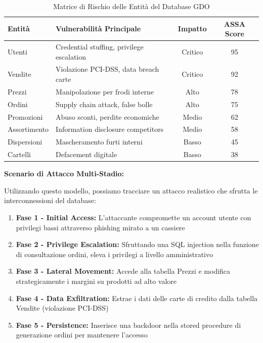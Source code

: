 \begin{table}[htbp]
\centering
\caption{Matrice di Rischio delle Entità del Database GDO}
\label{tab:risk_matrix_database}
\begin{tabularx}{\textwidth}{@{}lXcc@{}}
\toprule
\textbf{Entità} & \textbf{Vulnerabilità Principale} & \textbf{Impatto} & \textbf{ASSA Score}\\
\midrule
\rowcolor{red!20}
Utenti & Credential stuffing, privilege escalation & Critico & 95 \\
\rowcolor{red!20}
Vendite & Violazione PCI-DSS, data breach carte & Critico & 92 \\
\rowcolor{orange!20}
Prezzi & Manipolazione per frodi interne & Alto & 78 \\
\rowcolor{orange!20}
Ordini & Supply chain attack, false bolle & Alto & 75 \\
\rowcolor{yellow!20}
Promozioni & Abuso sconti, perdite economiche & Medio & 62 \\
\rowcolor{yellow!20}
Assortimento & Information disclosure competitors & Medio & 58 \\
\rowcolor{green!20}
Dispersioni & Mascheramento furti interni & Basso & 45 \\
\rowcolor{green!20}
Cartelli & Defacement digitale & Basso & 38 \\
\bottomrule
\end{tabularx}
\end{table}

\textbf{Scenario di Attacco Multi-Stadio:}

Utilizzando questo modello, possiamo tracciare un attacco realistico che sfrutta le interconnessioni del database:

\begin{enumerate}
\item \textbf{Fase 1 - Initial Access:} L'attaccante compromette un account utente con privilegi bassi attraverso phishing mirato a un cassiere

\item \textbf{Fase 2 - Privilege Escalation:} Sfruttando una SQL injection nella funzione di consultazione ordini, eleva i privilegi a livello amministrativo

\item \textbf{Fase 3 - Lateral Movement:} Accede alla tabella Prezzi e modifica strategicamente i margini su prodotti ad alto valore

\item \textbf{Fase 4 - Data Exfiltration:} Estrae i dati delle carte di credito dalla tabella Vendite (violazione PCI-DSS)

\item \textbf{Fase 5 - Persistence:} Inserisce una backdoor nella stored procedure di generazione ordini per mantenere l'accesso
\end{enumerate}

